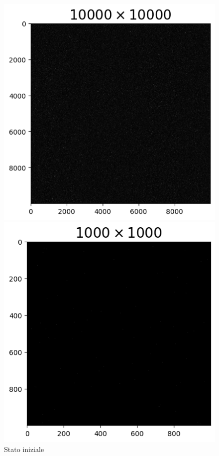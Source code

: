 \vspace*{\fill}


\vspace*{\fill}

\begin{figure}[htbp]
    \centering
    \begin{minipage}{0.45\textwidth}  
      \centering
      \includegraphics[page=1, width=\textwidth]{Immagini/simIsing2D/cg/cg_10000_2.0.png}
      \caption{Stato iniziale}
    \end{minipage}\hfill
    \begin{minipage}{0.45\textwidth}  
      \centering
      \includegraphics[page=1, width=\textwidth]{Immagini/simIsing2D/cg/cg_1000_2.0.png}

\end{minipage}
\end{figure}
